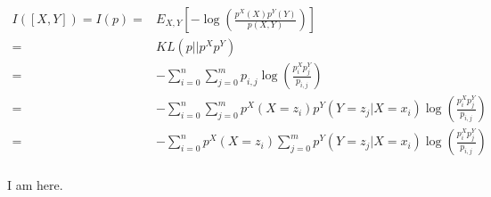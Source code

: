 \documentclass{article}
\begin{document}
\begin{eqnarray*}
    I([X,Y]) = I(p) =& E_{X,Y}[-\log(\frac{p^X(X)p^Y(Y)}{p(X,Y)})] \\
             =& KL(p||p^X p^Y) \\
             =&  - \sum_{i=0}^n \sum_{j=0}^m p_{i,j} \log(\frac{p^X_i p^Y_j}{p_{i,j}})\\
             =& - \sum_{i=0}^n \sum_{j=0}^m p^X(X=z_i)p^Y(Y=z_j|X=x_i) \log(\frac{p^X_i p^Y_j}{p_{i,j}})\\
             =& - \sum_{i=0}^n p^X(X=z_i) \sum_{j=0}^m p^Y(Y=z_j|X=x_i) \log(\frac{p^X_i p^Y_j}{p_{i,j}})\\
\end{eqnarray*}


I am here.








\end{document}
